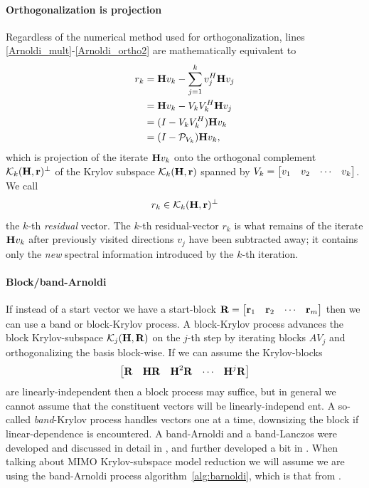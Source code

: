 \paragraph{Orthogonalization is projection} Regardless of the numerical method used for orthogonalization, lines \ref{Arnoldi_mult}-\ref{Arnoldi_ortho2} are mathematically equivalent to 
\begin{equation}
\begin{aligned}
r_k &= \textbf{\textup{H}} v_k - \sum_{j=1}^k v_j^H \textbf{\textup{H}} v_j \\ 
     &= \textbf{\textup{H}} v_k - V_kV_k^H\textbf{\textup{H}} v_j\\
     &=  (I-V_kV_k^H)\textbf{\textup{H}} v_k\\
     &=  (I-\mathcal{P}_{V_k})\textbf{\textup{H}} v_k,
\end{aligned}
\label{eq:arnoldi_orth}
\end{equation}
which is projection of the iterate $\textbf{\textup{H}} v_k$ onto the orthogonal complement $\mathcal{K}_{k}({\textbf{\textup{H}}},{\textbf{\textup{r}}})^\perp$ of the Krylov subspace $\mathcal{K}_{k}({\textbf{\textup{H}}},{\textbf{\textup{r}}})$ spanned by $V_k=\begin{bmatrix} v_1&v_2&\cdots&v_k\end{bmatrix}$.  We call   
\[
r_k \in \mathcal{K}_{k}({\textbf{\textup{H}}},{\textbf{\textup{r}}})^\perp
\]
the  $k$-th \emph{residual} vector.
The $k$-th residual-vector $r_k$ is what remains of the iterate $\textbf{\textup{H}} v_k$ after previously visited directions $v_j$ have been subtracted away; it contains only the \emph{new} spectral information introduced by the $k$-th iteration.  

\paragraph{Block/band-Arnoldi} 
If instead of a start vector we have a start-block $\textbf{\textup{R}}=\begin{bmatrix} \textbf{\textup{r}}_1&\textbf{\textup{r}}_2&\cdots&\textbf{\textup{r}}_m\end{bmatrix}$ then we can use a band or block-Krylov process.  A block-Krylov process advances the block Krylov-subspace $\mathcal{K}_{j}({\textbf{\textup{H}}},{\textbf{\textup{R}}})$ on the $j$-th step by iterating blocks $A V_j$ and orthogonalizing the basis block-wise.  If we can assume the Krylov-blocks
\[
\begin{bmatrix} \textbf{\textup{R}}& \textbf{\textup{H}} \textbf{\textup{R}}&\textbf{\textup{H}}^2 \textbf{\textup{R}}& \cdots& \textbf{\textup{H}}^j\textbf{\textup{R}}\end{bmatrix}
\]
are linearly-independent then a block process may suffice, but in general we cannot assume that the constituent vectors will be linearly-independ
ent.  A so-called \emph{band}-Krylov process handles vectors one at a time, downsizing the block if linear-dependence is encountered.  A band-Arnoldi and a band-Lanczos were developed and discussed in detail in \cite{AliagaMIMO}, and further developed a bit in \cite{AN}.    When talking about MIMO Krylov-subspace model reduction we will assume we are using the band-Arnoldi process algorithm~\ref{alg:barnoldi}, which is that from \cite{AN}. 

